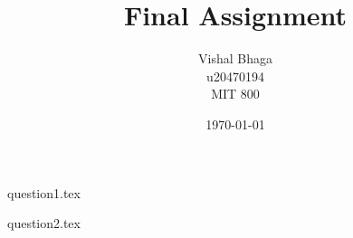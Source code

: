 \documentclass[12pt,a4paper]{article}
\title{Final Assignment}
\author{
    Vishal Bhaga\\
    u20470194\\
    MIT 800
}
\date{\today}
\begin{document}


\newpage

{question1.tex}

\newpage

{question2.tex}

\newpage

\printbibliography[title={References}]
\end{document}
